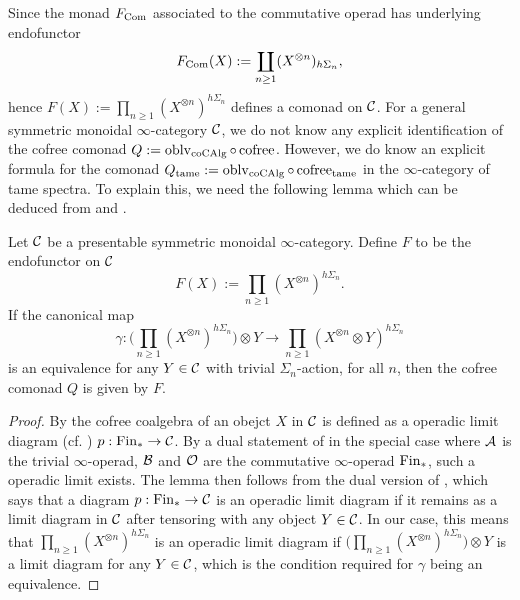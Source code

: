 Since the monad $F_{\operatorname{Com}}$ associated to the commutative operad has underlying endofunctor
$$
F_{\operatorname{Com}}(X) := \coprod_{n\geq 1} (X^{\otimes n})_{h\Sigma_n},
$$ hence $F(X):= \prod_{n\geq 1} (X^{\otimes n})^{h\Sigma_n}$ defines a comonad on ${\mathcal{C}}$.
For a general symmetric monoidal $\infty$-category ${\mathcal{C}}$, we do not know any explicit identification of the cofree comonad $Q:=\operatorname{oblv}_{\operatorname{coCAlg}}\circ \operatorname{cofree}$. 
However, we do know an explicit formula for the comonad $Q_{\operatorname{\operatorname{tame}}}:=\operatorname{oblv}_{\operatorname{coCAlg}}\circ \operatorname{cofree}_{\operatorname{\operatorname{tame}}}$ in the $\infty$-category of tame spectra. 
To explain this, we need the following lemma which can be deduced from \cite[Proposition 3.1.3.3]{HA} and \cite[Example 3.1.1.17]{HA}.
\begin{lemma}
\label{Cofree commutative coalgebra}
Let ${\mathcal{C}}$ be a presentable symmetric monoidal $\infty$-category.
Define $F$ to be the endofunctor on ${\mathcal{C}}$
$$
F(X):= \prod_{n\geq 1} (X^{\otimes n})^{h\Sigma_n}.
$$
If the canonical map 
$$
\gamma: \big( \prod_{n\geq 1} (X^{\otimes n})^{h\Sigma_n} \big) \otimes Y \to 
\prod_{n\geq 1} (X^{\otimes n} \otimes Y)^{h\Sigma_n}
$$
is an equivalence for any $Y\in {\mathcal{C}}$ with trivial $\Sigma_n$-action, for all $n$,
then the cofree comonad $Q$ is given by $F$.
\end{lemma}
\begin{proof}
    By \cite[Definition 3.1.3.1.]{HA} the cofree coalgebra of an obejct $X$ in ${\mathcal{C}}$ is defined as a operadic limit diagram (cf. \cite[Definition 3.1.1.2.]{HA}) $p:\operatorname{Fin}_{*} \to {\mathcal{C}}$.
    By a dual statement of \cite[Proposition 3.1.3.3]{HA} in the special case where ${\mathcal{A}}$ is the trivial $\infty$-operad, ${\mathcal{B}}$ and ${\mathcal{O}}$ are the commutative $\infty$-operad $\operatorname{Fin}_{*}$, such a operadic limit exists.
    The lemma then follows from the dual version of \cite[Example 3.1.1.17]{HA}, which says that a diagram $p:\operatorname{Fin}_{*} \to {\mathcal{C}}$ is an operadic limit diagram if it remains as a limit diagram in ${\mathcal{C}}$ after tensoring with any object $Y\in{\mathcal{C}}$. 
    In our case, this means that $\prod_{n\geq 1} (X^{\otimes n})^{h\Sigma_n}$ is an operadic limit diagram if 
    $\big( \prod_{n\geq 1} (X^{\otimes n})^{h\Sigma_n} \big) \otimes Y$ is a limit diagram for any $Y\in {\mathcal{C}}$, which is the condition required for $\gamma$ being an equivalence.
    
\end{proof}

